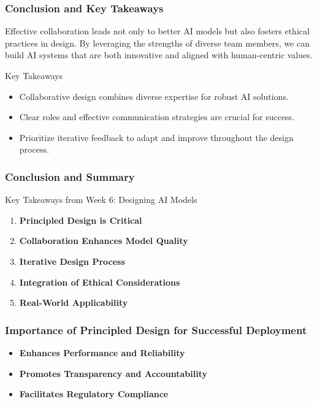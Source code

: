 \documentclass[aspectratio=169]{beamer}
\begin{document}
\begin{frame}[fragile]
    \frametitle{Conclusion and Key Takeaways}
    Effective collaboration leads not only to better AI models but also fosters ethical practices in design. By leveraging the strengths of diverse team members, we can build AI systems that are both innovative and aligned with human-centric values.

    \begin{block}{Key Takeaways}
        \begin{itemize}
            \item Collaborative design combines diverse expertise for robust AI solutions.
            \item Clear roles and effective communication strategies are crucial for success.
            \item Prioritize iterative feedback to adapt and improve throughout the design process.
        \end{itemize}
    \end{block}
\end{frame}

\begin{frame}[fragile]
    \frametitle{Conclusion and Summary}
    \begin{block}{Key Takeaways from Week 6: Designing AI Models}
        \begin{enumerate}
            \item \textbf{Principled Design is Critical}
            \item \textbf{Collaboration Enhances Model Quality}
            \item \textbf{Iterative Design Process}
            \item \textbf{Integration of Ethical Considerations}
            \item \textbf{Real-World Applicability}
        \end{enumerate}
    \end{block}
\end{frame}

\begin{frame}[fragile]
    \frametitle{Importance of Principled Design for Successful Deployment}
    \begin{itemize}
        \item \textbf{Enhances Performance and Reliability}
        \item \textbf{Promotes Transparency and Accountability}
        \item \textbf{Facilitates Regulatory Compliance}
    \end{itemize}
\end{frame}
\end{document}
